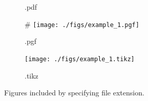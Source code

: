 \begin{figure}
\begin{subfigure}[t]{0.45\textwidth}
        \caption{.pdf}
        \label{figures:fig:exmaple:2:pdf}
        \end{subfigure}
        \begin{subfigure}[t]{0.45\textwidth}
        #
        \texttt{[image: ./figs/example\_1.pgf]}
        \caption{.pgf}
        \label{figures:fig:exmaple:2:pgf}
         \end{subfigure} 
        \begin{subfigure}[t]{0.45\textwidth}
        \texttt{[image: ./figs/example\_1.tikz]}
        \caption{.tikz}
        \label{figures:fig:exmaple:2:tikz}
        \end{subfigure}     
        \caption{Figures included by specifying file extension.}   
        \label{figures:fig:example:2}
    \end{figure}


